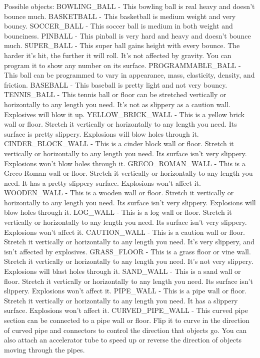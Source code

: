 Possible objects:
BOWLING_BALL - This bowling ball is real heavy and doesn't bounce much.
BASKETBALL - This basketball is medium weight and very bouncy.
SOCCER_BALL - This soccer ball is medium in both weight and bounciness.
PINBALL - This pinball is very hard and heavy and doesn't bounce much.
SUPER_BALL - This super ball gains height with every bounce. The harder it's hit, the further it will roll. It's not affected by gravity. You can program it to show any number on its surface.
PROGRAMMABLE_BALL - This ball can be programmed to vary in appearance, mass, elasticity, density, and friction.
BASEBALL - This baseball is pretty light and not very bouncy.
TENNIS_BALL - This tennis ball or floor can be stretched vertically or horizontally to any length you need. It's not as slippery as a caution wall. Explosives will blow it up.
YELLOW_BRICK_WALL - This is a yellow brick wall or floor. Stretch it vertically or horizontally to any length you need. Its surface is pretty slippery. Explosions will blow holes through it.
CINDER_BLOCK_WALL - This is a cinder block wall or floor. Stretch it vertically or horizontally to any length you need. Its surface isn't very slippery. Explosions won't blow holes through it.
GRECO_ROMAN_WALL - This is a Greco-Roman wall or floor. Stretch it vertically or horizontally to any length you need. It has a pretty slippery surface. Explosions won't affect it.
WOODEN_WALL - This is a wooden wall or floor. Stretch it vertically or horizontally to any length you need. Its surface isn't very slippery. Explosions will blow holes through it.
LOG_WALL - This is a log wall or floor. Stretch it vertically or horizontally to any length you need. Its surface isn't very slippery. Explosions won't affect it.
CAUTION_WALL - This is a caution wall or floor. Stretch it vertically or horizontally to any length you need. It's very slippery, and isn't affected by explosives.
GRASS_FLOOR - This is a grass floor or vine wall. Stretch it vertically or horizontally to any length you need. It's not very slippery. Explosions will blast holes through it.
SAND_WALL - This is a sand wall or floor. Stretch it vertically or horizontally to any length you need. Its surface isn't slippery. Explosions won't affect it.
PIPE_WALL - This is a pipe wall or floor. Stretch it vertically or horizontally to any length you need. It has a slippery surface. Explosions won't affect it.
CURVED_PIPE_WALL - This curved pipe section can be connected to a pipe wall or floor. Flip it to curve in the direction of curved pipe and connectors to control the direction that objects go. You can also attach an accelerator tube to speed up or reverse the direction of objects moving through the pipes.
